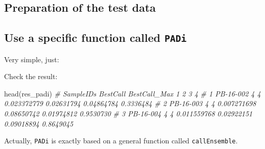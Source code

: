 \documentclass[
  12pt,
]{book}
\newenvironment{Shaded}{\begin{snugshade}}{\end{snugshade}}
\newcommand{\CommentTok}[1]{\textcolor[rgb]{0.56,0.35,0.01}{\textit{#1}}}
\newcommand{\FunctionTok}[1]{\textcolor[rgb]{0.00,0.00,0.00}{#1}}
\newcommand{\NormalTok}[1]{#1}
\newcommand{\OtherTok}[1]{\textcolor[rgb]{0.56,0.35,0.01}{#1}}
\newcommand{\SpecialCharTok}[1]{\textcolor[rgb]{0.00,0.00,0.00}{#1}}
\begin{document}
\hypertarget{preparation-of-the-test-data-1}{%
\subsection{Preparation of the test data}\label{preparation-of-the-test-data-1}}

\begin{Shaded}
\end{Shaded}

\hypertarget{use-a-specific-function-called-padi}{%
\subsection{\texorpdfstring{Use a specific function called \texttt{PADi}}{Use a specific function called PADi}}\label{use-a-specific-function-called-padi}}

Very simple, just:

Check the result:

\begin{Shaded}
\begin{Highlighting}[]
\FunctionTok{head}\NormalTok{(res\_padi)}
\CommentTok{\#   SampleIDs BestCall BestCall\_Max           1          2          3         4}
\CommentTok{\# 1 PB{-}16{-}002        4            4 0.023372779 0.02631794 0.04864784 0.3336484}
\CommentTok{\# 2 PB{-}16{-}003        4            4 0.007271698 0.08650742 0.01974812 0.9530730}
\CommentTok{\# 3 PB{-}16{-}004        4            4 0.011559768 0.02922151 0.09018894 0.8649045}
\end{Highlighting}
\end{Shaded}

Actually, \texttt{PADi} is exactly based on a general function called \texttt{callEnsemble}.
\end{document}
